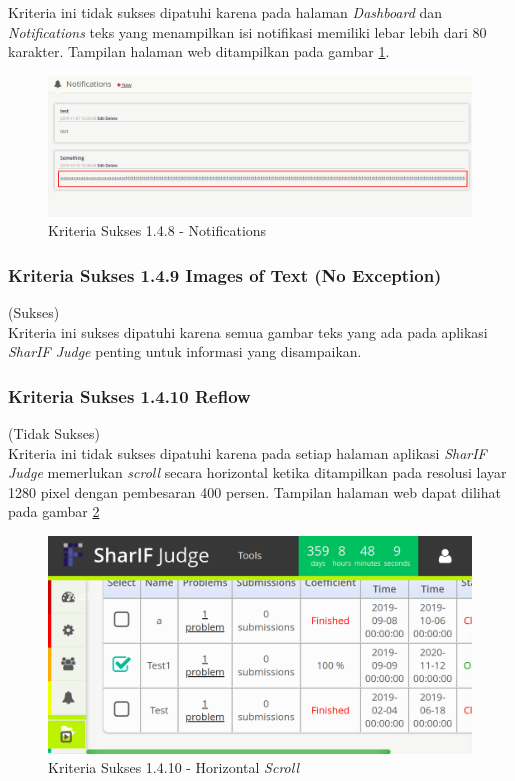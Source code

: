 \documentclass[a4paper,twoside]{article}
\begin{document}
\begin{enumerate}
		Kriteria ini tidak sukses dipatuhi karena pada halaman \textit{Dashboard} dan \textit{Notifications} teks yang menampilkan isi notifikasi memiliki lebar lebih dari 80 karakter. Tampilan halaman web ditampilkan pada gambar \ref{fig:kepatuhan_1_4_8_notifications}.
		\begin{figure}[H]
			\centering  
			\includegraphics[scale=0.25]{kepatuhan_1_4_8_notifications}  
			\caption[Kriteria Sukses 1.4.8 - Notifications]{Kriteria Sukses 1.4.8 - Notifications} 
			\label{fig:kepatuhan_1_4_8_notifications} 
		\end{figure}
		
		\subsubsection*{Kriteria Sukses 1.4.9 Images of Text (No Exception)}
		\label{subsubsec:kepatuhan_kriteria_1.4.9}
		(Sukses) \\
		
		Kriteria ini sukses dipatuhi karena semua gambar teks yang ada pada aplikasi \textit{SharIF Judge} penting untuk informasi yang disampaikan.
		
		\subsubsection*{Kriteria Sukses 1.4.10 Reflow}
		\label{subsubsec:kepatuhan_kriteria_1.4.10}
		(Tidak Sukses) \\
		
		Kriteria ini tidak sukses dipatuhi karena pada setiap halaman aplikasi \textit{SharIF Judge} memerlukan \textit{scroll} secara horizontal ketika ditampilkan pada resolusi layar 1280 pixel dengan pembesaran 400 persen. Tampilan halaman web dapat dilihat pada gambar \ref{fig:kepatuhan_1_4_10_reflow}
		\begin{figure}[H]
			\centering  
			\includegraphics[scale=0.25]{kepatuhan_1_4_10}  
			\caption[Kriteria Sukses 1.4.10 - Horizontal \textit{Scroll}]{Kriteria Sukses 1.4.10 - Horizontal \textit{Scroll}} 
			\label{fig:kepatuhan_1_4_10_reflow} 
		\end{figure}
		

\end{enumerate}
\end{document}
